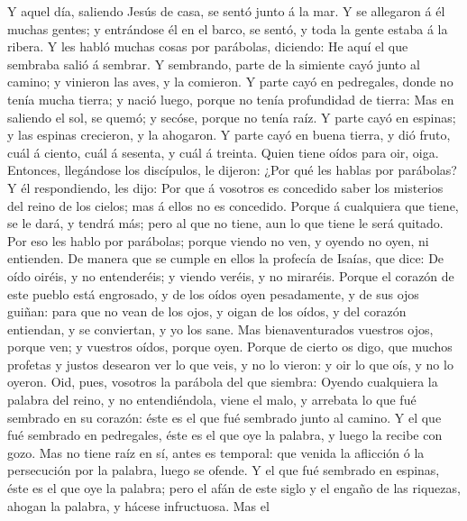  Y aquel día, saliendo Jesús de casa, se sentó junto á la
mar.  Y se allegaron á él muchas gentes; y entrándose él en
el barco, se sentó, y toda la gente estaba á la ribera.  Y
les habló muchas cosas por parábolas, diciendo: He aquí el que sembraba
salió á sembrar.  Y sembrando, parte de la simiente cayó
junto al camino; y vinieron las aves, y la comieron.  Y
parte cayó en pedregales, donde no tenía mucha tierra; y nació luego,
porque no tenía profundidad de tierra:  Mas en saliendo el
sol, se quemó; y secóse, porque no tenía raíz.  Y parte cayó
en espinas; y las espinas crecieron, y la ahogaron.  Y parte
cayó en buena tierra, y dió fruto, cuál á ciento, cuál á sesenta, y cuál
á treinta.  Quien tiene oídos para oir, oiga. 
Entonces, llegándose los discípulos, le dijeron: ¿Por qué les hablas por
parábolas?  Y él respondiendo, les dijo: Por que á vosotros
es concedido saber los misterios del reino de los cielos; mas á ellos no
es concedido.  Porque á cualquiera que tiene, se le dará, y
tendrá más; pero al que no tiene, aun lo que tiene le será quitado.
 Por eso les hablo por parábolas; porque viendo no ven, y
oyendo no oyen, ni entienden.  De manera que se cumple en
ellos la profecía de Isaías, que dice: De oído oiréis, y no entenderéis;
y viendo veréis, y no miraréis.  Porque el corazón de este
pueblo está engrosado, y de los oídos oyen pesadamente, y de sus ojos
guiñan: para que no vean de los ojos, y oigan de los oídos, y del
corazón entiendan, y se conviertan, y yo los sane.  Mas
bienaventurados vuestros ojos, porque ven; y vuestros oídos, porque
oyen.  Porque de cierto os digo, que muchos profetas y
justos desearon ver lo que veis, y no lo vieron: y oir lo que oís, y no
lo oyeron.  Oid, pues, vosotros la parábola del que
siembra:  Oyendo cualquiera la palabra del reino, y no
entendiéndola, viene el malo, y arrebata lo que fué sembrado en su
corazón: éste es el que fué sembrado junto al camino.  Y el
que fué sembrado en pedregales, éste es el que oye la palabra, y luego
la recibe con gozo.  Mas no tiene raíz en sí, antes es
temporal: que venida la aflicción ó la persecución por la palabra, luego
se ofende.  Y el que fué sembrado en espinas, éste es el
que oye la palabra; pero el afán de este siglo y el engaño de las
riquezas, ahogan la palabra, y hácese infructuosa.  Mas el
